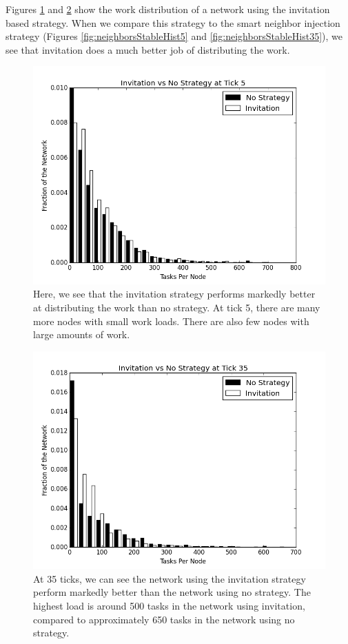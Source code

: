 \documentclass[11pt,conference]{IEEEtran}
\begin{document}
{	
	Figures \ref{fig:inviteStableHist5} and \ref{fig:inviteStableHist35} show the work distribution of a network using the invitation based strategy.
	When we compare this strategy to the smart neighbor injection strategy (Figures \ref{fig:neighborsStableHist5} and \ref{fig:neighborsStableHist35}), we see that invitation does a much better job of distributing the work.
	
	\begin{figure}
		\centering
		\includegraphics[width=0.7\linewidth]{figs/inviteStableHist5}
		\caption[Invitiation vs no strategy after 5 ticks]{Here, we see that the invitation strategy performs markedly better at distributing the work than no strategy.  At tick 5, there are many more nodes with small work loads.  There are also few nodes with large amounts of work.}
		\label{fig:inviteStableHist5}
	\end{figure}
	
	\begin{figure}
		\centering
		\includegraphics[width=0.7\linewidth]{figs/inviteStableHist35}
		\caption[Invitiation vs no strategy after 35 ticks]{At 35 ticks, we can see the network using the invitation strategy perform markedly better than the network using no strategy. The highest load is around 500 tasks in the network using invitation, compared to approximately 650 tasks in the network using no strategy.}
		\label{fig:inviteStableHist35}
	\end{figure}
	
}
\end{document}
